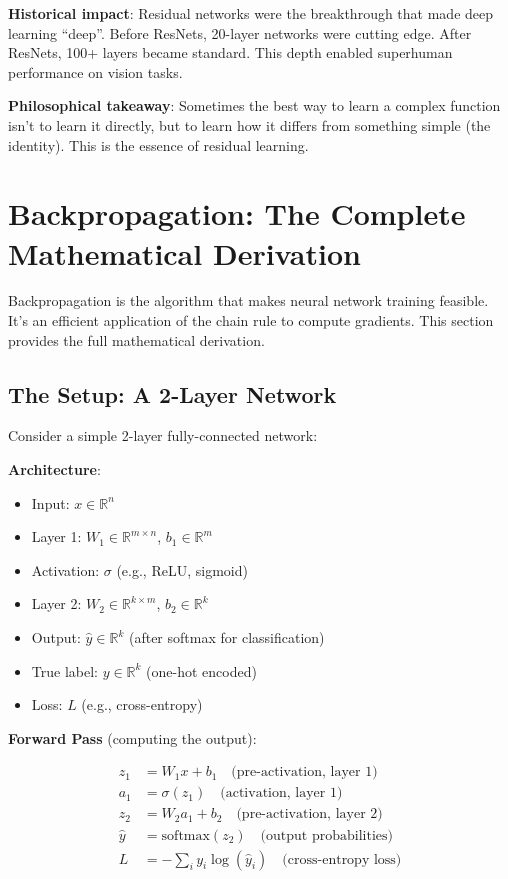 \documentclass[11pt,oneside]{book}
\begin{document}
\textbf{Historical impact}: Residual networks were the breakthrough that made deep learning ``deep''. Before ResNets, 20-layer networks were cutting edge. After ResNets, 100+ layers became standard. This depth enabled superhuman performance on vision tasks.

\textbf{Philosophical takeaway}: Sometimes the best way to learn a complex function isn't to learn it directly, but to learn how it differs from something simple (the identity). This is the essence of residual learning.

\section{Backpropagation: The Complete Mathematical Derivation}

Backpropagation is the algorithm that makes neural network training feasible. It's an efficient application of the chain rule to compute gradients. This section provides the full mathematical derivation.

\subsection{The Setup: A 2-Layer Network}

Consider a simple 2-layer fully-connected network:

\textbf{Architecture}:
\begin{itemize}
\item Input: $x \in \mathbb{R}^n$
\item Layer 1: $W_1 \in \mathbb{R}^{m \times n}$, $b_1 \in \mathbb{R}^m$
\item Activation: $\sigma$ (e.g., ReLU, sigmoid)
\item Layer 2: $W_2 \in \mathbb{R}^{k \times m}$, $b_2 \in \mathbb{R}^k$
\item Output: $\hat{y} \in \mathbb{R}^k$ (after softmax for classification)
\item True label: $y \in \mathbb{R}^k$ (one-hot encoded)
\item Loss: $L$ (e.g., cross-entropy)
\end{itemize}

\textbf{Forward Pass} (computing the output):

\begin{align*}
z_1 &= W_1 x + b_1 \quad \text{(pre-activation, layer 1)} \\
a_1 &= \sigma(z_1) \quad \text{(activation, layer 1)} \\
z_2 &= W_2 a_1 + b_2 \quad \text{(pre-activation, layer 2)} \\
\hat{y} &= \text{softmax}(z_2) \quad \text{(output probabilities)} \\
L &= -\sum_i y_i \log(\hat{y}_i) \quad \text{(cross-entropy loss)}
\end{align*}
\end{document}
